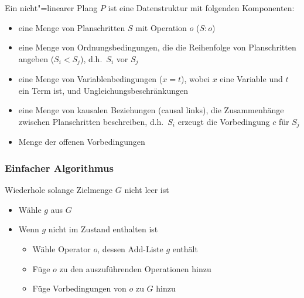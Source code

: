 Ein nicht"=linearer Plang $P$ ist eine Datenstruktur mit folgenden Komponenten:
\begin{itemize}
	\item eine Menge von Planschritten $S$ mit Operation $o$ ($S:o$)
	\item eine Menge von Ordnungsbedingungen, die die Reihenfolge von Planschritten angeben ($S_i < S_j$), d.h.\ \glqq $S_i$ vor $S_j$ \grqq
	\item eine Menge von Variablenbedingungen ($x=t$), wobei $x$ eine Variable und $t$ ein Term ist, und Ungleichungsbeschränkungen
	\item eine Menge von kausalen Beziehungen (causal links), die Zusammenhänge zwischen Planschritten beschreiben, d.h.\ $S_i$ erzeugt die Vorbedingung $c$ für $S_j$
	\item Menge der offenen Vorbedingungen
\end{itemize}

\subsubsection{Einfacher Algorithmus}
Wiederhole solange Zielmenge $G$ nicht leer ist
\begin{itemize}
	\item Wähle $g$ aus $G$
	\item Wenn $g$ nicht im Zustand enthalten ist
	\begin{itemize}
		\item Wähle Operator $o$, dessen Add-Liste $g$ enthält
		\item Füge $o$ zu den auszuführenden Operationen hinzu
		\item Füge Vorbedingungen von $o$ zu $G$ hinzu
	\end{itemize}
\end{itemize}

